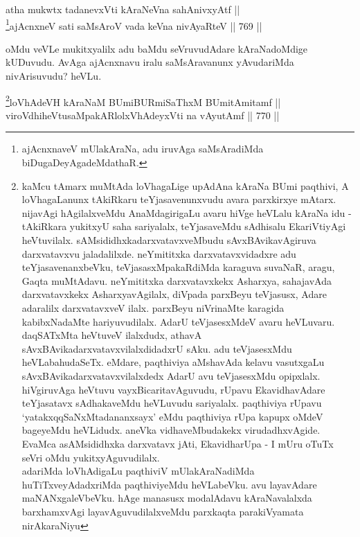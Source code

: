 
\begin{shl}
atha mukwtx tadanevxVti kAraNeVna sahAnivxyAtf || \\
\footnote{ajAcnxnaveV mUlakAraNa, adu iruvAga saMsAradiMda biDugaDeyAgadeMdathaR.}ajAcnxneV sati saMsAroV vada keVna nivAyaRteV \hfill || 769 ||  
\end{shl}


\begin{artha} 
oMdu veVLe mukitxyalilx adu baMdu seVruvudAdare kAraNadoMdige kUDuvudu. AvAga ajAcnxnavu iralu saMsAravanunx yAvudariMda nivArisuvudu? heVLu.
\end{artha}



\begin{shl}
\footnote{kaMcu tAmarx muMtAda loVhagaLige upAdAna kAraNa BUmi 
paqthivi, A loVhagaLanunx tAkiRkaru teYjasavenunxvudu avara parxkirxye 
mAtarx. nijavAgi hAgilalxveMdu AnaMdagirigaLu avaru hiVge heVLalu 
kAraNa idu - tAkiRkara yukitxyU saha sariyalalx, teYjasaveMdu 
sAdhisalu EkariVtiyAgi heVtuvilalx. sAMsididhxkadarxvatavxveMbudu 
sAvxBAvikavAgiruva darxvatavxvu jaladalilxde. neYmititxka 
darxvatavxvidadxre adu teYjasavenanxbeVku, teVjasasxMpakaRdiMda 
karaguva suvaNaR, aragu, Gaqta muMtAdavu. neYmititxka darxvatavxkekx 
Asharxya, sahajavAda darxvatavxkekx AsharxyavAgilalx, diVpada parxBeyu 
teVjasusx, Adare adaralilx darxvatavxveV ilalx. parxBeyu niVrinaMte 
karagida kabibxNadaMte hariyuvudilalx. AdarU teVjasesxMdeV avaru 
heVLuvaru. daqSATxMta heVtuveV ilalxdudx, athavA 
sAvxBAvikadarxvatavxvilalxdidadxrU sAku. adu teVjasesxMdu 
heVLabahudaSeTx. eMdare, paqthiviya aMshavAda kelavu vasutxgaLu 
sAvxBAvikadarxvatavxvilalxdedx AdarU avu teVjasesxMdu opipxlalx. 
hiVgiruvAga heVtuvu vayxBicaritavAguvudu, rUpavu EkavidhavAdare 
teYjasatavx sAdhakaveMdu heVLuvudu sariyalalx. paqthiviya rUpavu 
`yatakxqqSaNxMtadananxsayx' eMdu paqthiviya rUpa kapupx oMdeV 
bageyeMdu heVLidudx. aneVka vidhaveMbudakekx virudadhxvAgide. EvaMca 
asAMsididhxka darxvatavx jAti, EkavidharUpa - I mUru oTuTx seVri oMdu 
yukitxyAguvudilalx.\\ 
adariMda loVhAdigaLu paqthiviV mUlakAraNadiMda huTiTxveyAdadxriMda 
paqthiviyeMdu heVLabeVku. avu layavAdare maNANxgaleVbeVku. hAge 
manasusx modalAdavu kAraNavalalxda barxhamxvAgi layavAguvudilalxveMdu 
parxkaqta parakiVyamata nirAkaraNiyu}loVhAdeVH kAraNaM BUmiBURmiSaThxM BUmitAmitamf || \\
viroVdhiheVtusaMpakARlolxVhAdeyxVti na vAyutAmf \hfill || 770 ||  
\end{shl}

